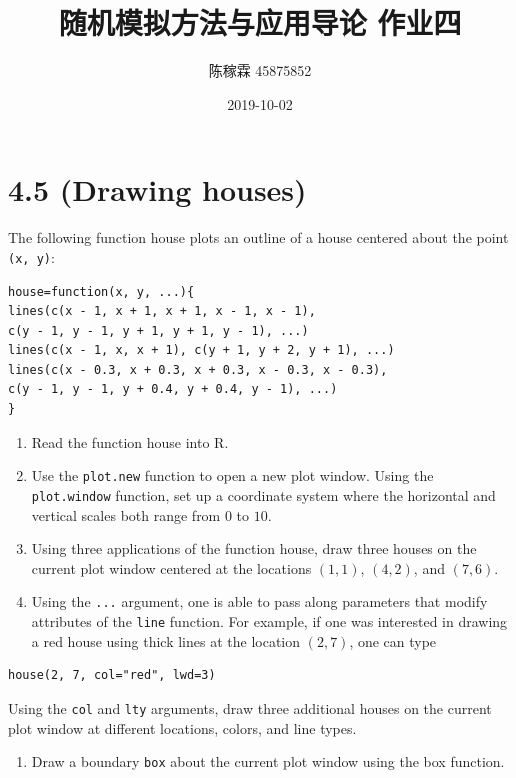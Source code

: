 \documentclass[]{article}
\title{随机模拟方法与应用导论 作业四}
\author{陈稼霖 45875852}
\date{2019-10-02}
\providecommand{\tightlist}{%
  \setlength{\itemsep}{0pt}\setlength{\parskip}{0pt}}
\begin{document}
\maketitle

\hypertarget{drawing-houses}{%
\section{4.5 (Drawing houses)}\label{drawing-houses}}

The following function house plots an outline of a house centered about
the point \texttt{(x,\ y)}:

\begin{verbatim}
house=function(x, y, ...){
lines(c(x - 1, x + 1, x + 1, x - 1, x - 1),
c(y - 1, y - 1, y + 1, y + 1, y - 1), ...)
lines(c(x - 1, x, x + 1), c(y + 1, y + 2, y + 1), ...)
lines(c(x - 0.3, x + 0.3, x + 0.3, x - 0.3, x - 0.3),
c(y - 1, y - 1, y + 0.4, y + 0.4, y - 1), ...)
}
\end{verbatim}

\begin{enumerate}
\def\labelenumi{\alph{enumi}.}
\item
  Read the function house into R.
\item
  Use the \texttt{plot.new} function to open a new plot window. Using
  the \texttt{plot.window} function, set up a coordinate system where
  the horizontal and vertical scales both range from \(0\) to \(10\).
\item
  Using three applications of the function house, draw three houses on
  the current plot window centered at the locations \((1, 1)\),
  \((4, 2)\), and \((7, 6)\).
\item
  Using the \texttt{...} argument, one is able to pass along parameters
  that modify attributes of the \texttt{line} function. For example, if
  one was interested in drawing a red house using thick lines at the
  location \((2, 7)\), one can type
\end{enumerate}

\begin{verbatim}
house(2, 7, col="red", lwd=3)
\end{verbatim}

Using the \texttt{col} and \texttt{lty} arguments, draw three additional
houses on the current plot window at different locations, colors, and
line types.

\begin{enumerate}
\def\labelenumi{\alph{enumi}.}
\setcounter{enumi}{4}
\tightlist
\item
  Draw a boundary \texttt{box} about the current plot window using the
  box function.
\end{enumerate}
\end{document}
